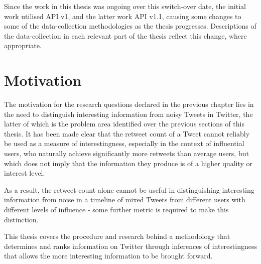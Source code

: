 Since the work in this thesis was ongoing over this switch-over date, the initial work utilised API v1, and the latter work API v1.1, causing some changes to some of the data-collection methodologies as the thesis progresses. Descriptions of the data-collection in each relevant part of the thesis reflect this change, where appropriate.


\section{Motivation}
The motivation for the research questions declared in the previous chapter lies in the need to distinguish interesting information from noisy Tweets in Twitter, the latter of which is the problem area identified over the previous sections of this thesis. It has been made clear that the retweet count of a Tweet cannot reliably be used as a measure of interestingness, especially in the context of influential users, who naturally achieve significantly more retweets than average users, but which does not imply that the information they produce is of a higher quality or interest level.

As a result, the retweet count alone cannot be useful in distinguishing interesting information from noise in a timeline of mixed Tweets from different users with different levels of influence - some further metric is required to make this distinction. 

This thesis covers the procedure and research behind a methodology that determines and ranks information on Twitter through inferences of interestingness that allows the more interesting information to be brought forward. 
